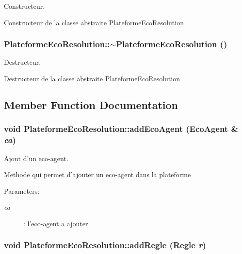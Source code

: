Constructeur. 

Constructeur de la classe abstraite \hyperlink{classPlateformeEcoResolution}{PlateformeEcoResolution} \hypertarget{classPlateformeEcoResolution_356b4862f53c4be870304e5186601b5a}{
\subsubsection[{$\sim$PlateformeEcoResolution}]{\setlength{\rightskip}{0pt plus 5cm}PlateformeEcoResolution::$\sim$PlateformeEcoResolution ()}}
\label{classPlateformeEcoResolution_356b4862f53c4be870304e5186601b5a}


Destructeur. 

Destructeur de la classe abstraite \hyperlink{classPlateformeEcoResolution}{PlateformeEcoResolution} 

\subsection{Member Function Documentation}
\hypertarget{classPlateformeEcoResolution_6fdb4c8ecc62252da4326d9763d4f28d}{
\subsubsection[{addEcoAgent}]{\setlength{\rightskip}{0pt plus 5cm}void PlateformeEcoResolution::addEcoAgent ({\bf EcoAgent} \& {\em ea})}}
\label{classPlateformeEcoResolution_6fdb4c8ecc62252da4326d9763d4f28d}


Ajout d'un eco-agent. 

Methode qui permet d'ajouter un eco-agent dans la plateforme

\begin{Desc}
\item[Parameters:]
\begin{description}
\item[{\em ea}]: l'eco-agent a ajouter \end{description}
\end{Desc}
\hypertarget{classPlateformeEcoResolution_8a36263f2e16fa04ace79d7eab917d01}{
\subsubsection[{addRegle}]{\setlength{\rightskip}{0pt plus 5cm}void PlateformeEcoResolution::addRegle (Regle {\em r})}}
\label{classPlateformeEcoResolution_8a36263f2e16fa04ace79d7eab917d01}


